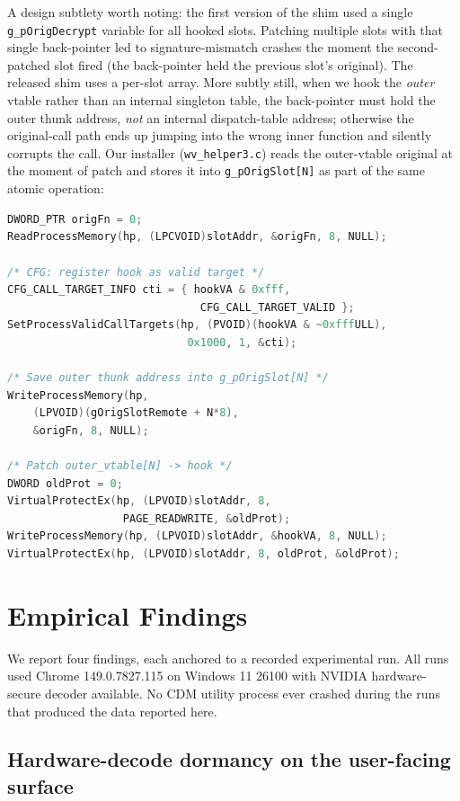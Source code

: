 \documentclass[11pt,letterpaper]{article}
\let\oldsection\section
\renewcommand{\section}{\clearpage\oldsection}
\begin{document}
A design subtlety worth noting: the first version of the shim used
a single \texttt{g\_pOrigDecrypt} variable for all hooked slots.
Patching multiple slots with that single back-pointer led to
signature-mismatch crashes the moment the second-patched slot fired
(the back-pointer held the previous slot's original). The released
shim uses a per-slot array. More subtly still, when we hook the
\emph{outer} vtable rather than an internal singleton table, the
back-pointer must hold the outer thunk address, \emph{not} an
internal dispatch-table address; otherwise the original-call path
ends up jumping into the wrong inner function and silently corrupts
the call. Our installer (\texttt{wv\_helper3.c}) reads the
outer-vtable original at the moment of patch and stores it into
\texttt{g\_pOrigSlot[N]} as part of the same atomic operation:

\begin{lstlisting}[language=C, basicstyle=\ttfamily\scriptsize]
DWORD_PTR origFn = 0;
ReadProcessMemory(hp, (LPCVOID)slotAddr, &origFn, 8, NULL);

/* CFG: register hook as valid target */
CFG_CALL_TARGET_INFO cti = { hookVA & 0xfff,
                              CFG_CALL_TARGET_VALID };
SetProcessValidCallTargets(hp, (PVOID)(hookVA & ~0xfffULL),
                            0x1000, 1, &cti);

/* Save outer thunk address into g_pOrigSlot[N] */
WriteProcessMemory(hp,
    (LPVOID)(gOrigSlotRemote + N*8),
    &origFn, 8, NULL);

/* Patch outer_vtable[N] -> hook */
DWORD oldProt = 0;
VirtualProtectEx(hp, (LPVOID)slotAddr, 8,
                  PAGE_READWRITE, &oldProt);
WriteProcessMemory(hp, (LPVOID)slotAddr, &hookVA, 8, NULL);
VirtualProtectEx(hp, (LPVOID)slotAddr, 8, oldProt, &oldProt);
\end{lstlisting}

\section{Empirical Findings}
\label{sec:findings}

We report four findings, each anchored to a recorded experimental
run. All runs used Chrome 149.0.7827.115 on Windows 11 26100 with
NVIDIA hardware-secure decoder available. No CDM utility process
ever crashed during the runs that produced the data reported here.

\subsection{Hardware-decode dormancy on the user-facing surface}
\label{sec:findings-dormancy}
\end{document}

